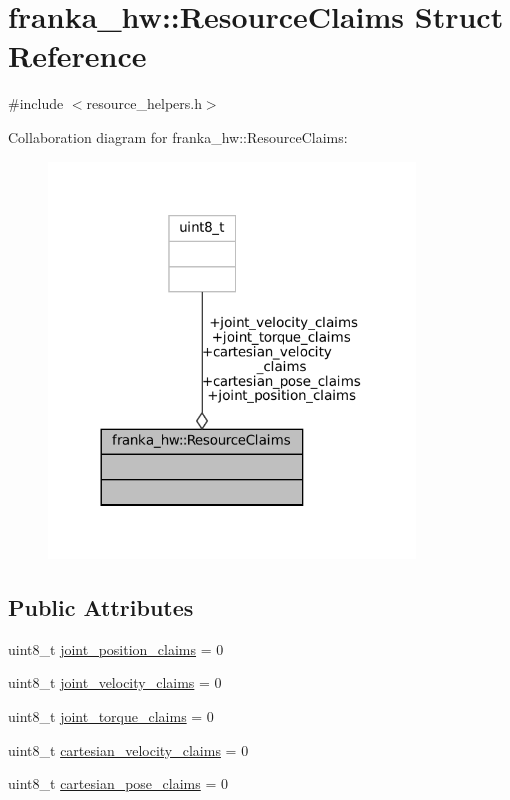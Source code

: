 \hypertarget{structfranka__hw_1_1ResourceClaims}{}\section{franka\+\_\+hw\+:\+:Resource\+Claims Struct Reference}
\label{structfranka__hw_1_1ResourceClaims}


{\ttfamily \#include $<$resource\+\_\+helpers.\+h$>$}



Collaboration diagram for franka\+\_\+hw\+:\+:Resource\+Claims\+:
\nopagebreak
\begin{figure}[H]
\begin{center}
\leavevmode
\includegraphics[width=276pt]{structfranka__hw_1_1ResourceClaims__coll__graph}
\end{center}
\end{figure}
\subsection*{Public Attributes}
\begin{DoxyCompactItemize}
\item 
uint8\+\_\+t \hyperlink{structfranka__hw_1_1ResourceClaims_aaceed7e0978a7f78a285f9475b46e38d}{joint\+\_\+position\+\_\+claims} = 0
\item 
uint8\+\_\+t \hyperlink{structfranka__hw_1_1ResourceClaims_ada8a410eb33611ecadffcc9c34c249e9}{joint\+\_\+velocity\+\_\+claims} = 0
\item 
uint8\+\_\+t \hyperlink{structfranka__hw_1_1ResourceClaims_a9867b095f677700e538c80a26325c938}{joint\+\_\+torque\+\_\+claims} = 0
\item 
uint8\+\_\+t \hyperlink{structfranka__hw_1_1ResourceClaims_a2668310af64175428ebde96da920c9bb}{cartesian\+\_\+velocity\+\_\+claims} = 0
\item 
uint8\+\_\+t \hyperlink{structfranka__hw_1_1ResourceClaims_a55a5153f3db3a7fcf512704d585b70f7}{cartesian\+\_\+pose\+\_\+claims} = 0
\end{DoxyCompactItemize}


